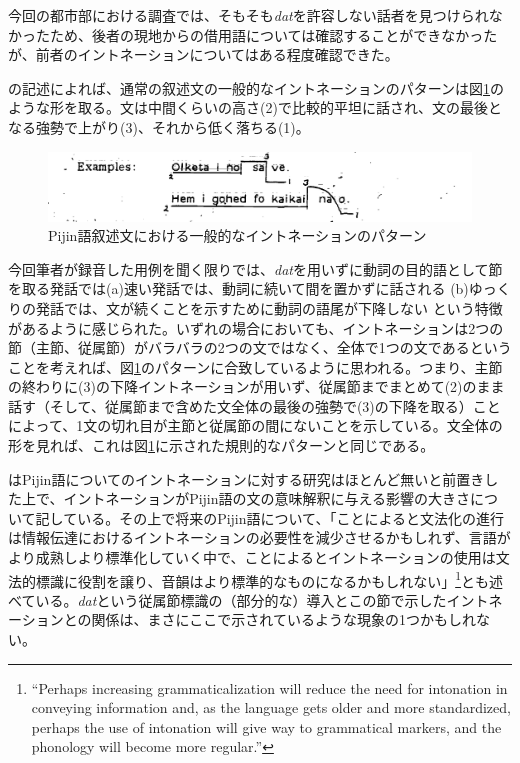 今回の都市部における調査では、そもそも\textit{dat}を許容しない話者を見つけられなかったため、後者の現地からの借用語については確認することができなかったが、前者のイントネーションについてはある程度確認できた。

\cite{eric}の記述によれば、通常の叙述文の一般的なイントネーションのパターンは図\ref{fig:intonation}のような形を取る。文は中間くらいの高さ(2)で比較的平坦に話され、文の最後となる強勢で上がり(3)、それから低く落ちる(1)。

\begin{figure}[ht]
  \includegraphics[width=15cm]{./intonation.png}
  \caption{Pijin語叙述文における一般的なイントネーションのパターン\cite[10]{eric}}
  \label{fig:intonation}
\end{figure}

今回筆者が録音した用例を聞く限りでは、\textit{dat}を用いずに動詞の目的語として節を取る発話では(a)速い発話では、動詞に続いて間を置かずに話される (b)ゆっくりの発話では、文が続くことを示すために動詞の語尾が下降しない という特徴があるように感じられた。いずれの場合においても、イントネーションは2つの節（主節、従属節）がバラバラの2つの文ではなく、全体で1つの文であるということを考えれば、図\ref{fig:intonation}のパターンに合致しているように思われる。つまり、主節の終わりに(3)の下降イントネーションが用いず、従属節までまとめて(2)のまま話す（そして、従属節まで含めた文全体の最後の強勢で(3)の下降を取る）ことによって、1文の切れ目が主節と従属節の間にないことを示している。文全体の形を見れば、これは図\ref{fig:intonation}に示された規則的なパターンと同じである。

\cite{phonology}はPijin語についてのイントネーションに対する研究はほとんど無いと前置きした上で、イントネーションがPijin語の文の意味解釈に与える影響の大きさについて記している。その上で将来のPijin語について、「ことによると文法化の進行は情報伝達におけるイントネーションの必要性を減少させるかもしれず、言語がより成熟しより標準化していく中で、ことによるとイントネーションの使用は文法的標識に役割を譲り、音韻はより標準的なものになるかもしれない」\footnote{
``Perhaps increasing grammaticalization will reduce the need for intonation in conveying information and, as the language gets older and more standardized, perhaps the use of intonation will give way to grammatical markers, and the phonology will become more regular.''\citep{phonology}}とも述べている。\textit{dat}という従属節標識の（部分的な）導入とこの節で示したイントネーションとの関係は、まさにここで示されているような現象の1つかもしれない。

